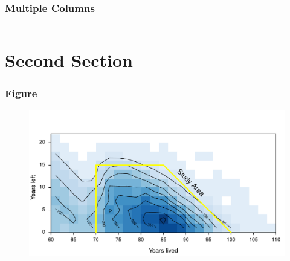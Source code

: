 \documentclass{beamer}
\begin{document}
\begin{frame}
\frametitle{Multiple Columns}
\begin{columns}[c] %


\end{columns}
\end{frame}

\section{Second Section}


\begin{frame}
\frametitle{Figure}

\begin{figure}
\includegraphics[width=0.8\linewidth]{Figures/CaseCountFemales}
\end{figure}
\end{frame}







\end{document}

